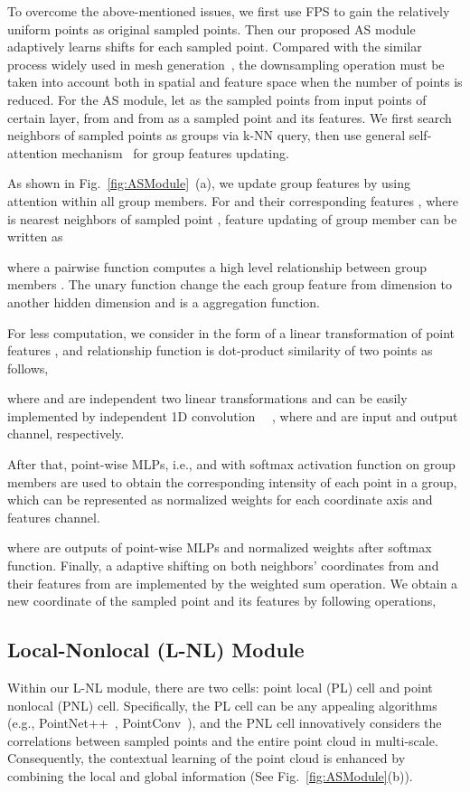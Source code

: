 \documentclass[10pt,twocolumn,letterpaper]{article}
\begin{document}
	
	To overcome the above-mentioned issues, we first use FPS to gain the relatively uniform points as original sampled points. Then our proposed AS module adaptively learns shifts for each sampled point. Compared with the similar process widely used in mesh generation~\cite{wang2018pixel2mesh}, the downsampling operation must be taken into account both in spatial and feature space when the number of points is reduced.  For the AS module, let  as the sampled  points from   input points of certain layer,  from  and  from  as  a sampled point and its features. We first search neighbors of sampled points as groups via k-NN query, then use general self-attention mechanism~\cite{vaswani2017attention} for group features updating.
	
	
	As shown in Fig.~\ref{fig:ASModule}~(a), we update group features by using attention within all group members. For  and their corresponding features , where  is  nearest neighbors of sampled point , feature updating of group member  can be written as 
	
	where a pairwise function  computes a high level relationship between group members . The unary function  change the each group feature  from dimension  to another hidden dimension  and  is a aggregation function. 
	
	For less computation, we consider  in the form of a linear transformation of point features  , and relationship function  is dot-product similarity of two points as follows, 
	
	where  and  are independent two linear transformations and can be easily implemented by independent 1D convolution ~~, where  and  are input and output channel, respectively. 
	
	


	After that, point-wise MLPs, i.e.,  and  with softmax activation function on  group members are used to obtain the corresponding intensity of each point in a group, which can be represented as normalized weights for each coordinate axis and features channel.
	
	where  are outputs of point-wise MLPs and normalized weights after softmax function. Finally, a adaptive shifting on both  neighbors' coordinates from  and their features from  are implemented by the weighted sum operation. We obtain a new coordinate of the sampled point  and its features  by following operations,
	
	
	
	\subsection{Local-Nonlocal (L-NL) Module}
	\label{NL}
	Within our L-NL module, there are two cells: point local (PL) cell and point nonlocal (PNL) cell. Specifically, the PL cell can be any appealing algorithms (e.g., PointNet++~\cite{pointnet2}, PointConv~\cite{PointConv}), and the PNL cell innovatively considers the correlations between sampled points and the entire point cloud in multi-scale. Consequently, the contextual learning of the point cloud is enhanced by combining the local and global information (See Fig.~\ref{fig:ASModule}(b)).
	
\end{document}
